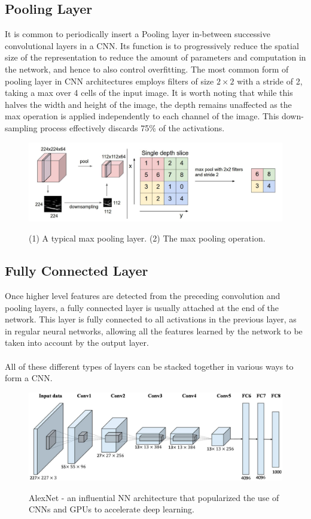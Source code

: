 \documentclass[12pt, a4paper]{report}
\begin{document}
\subsection{Pooling Layer}
It is common to periodically insert a Pooling layer in-between successive convolutional layers in a CNN. Its function is to progressively reduce the spatial size of the representation to reduce the amount of parameters and computation in the network, and hence to also control overfitting.\cite{cs231n} The most common form of pooling layer in CNN architectures employs filters of size $2 \times 2$ with a stride of 2, taking a max over 4 cells of the input image. It is worth noting that while this halves the width and height of the image, the depth remains unaffected as the max operation is applied independently to each channel of the image. This down-sampling process effectively discards 75\% of the activations.
\begin{figure}[h]
\centering
\includegraphics[width=\textwidth]{cnn2.jpg}
\caption{(1) A typical max pooling layer. (2) The max pooling operation.}\cite{cs231n}
\end{figure}
\subsection{Fully Connected Layer}
Once higher level features are detected from the preceding convolution and pooling layers, a fully connected layer is usually attached at the end of the network. This layer is fully connected to all activations in the previous layer, as in regular neural networks, allowing all the features learned by the network to be taken into account by the output layer.
\paragraph{}
All of these different types of layers can be stacked together in various ways to form a CNN.
\begin{figure}[h]
\centering
\includegraphics[width=\textwidth]{cnn3.jpg}
\caption{AlexNet - an influential NN architecture that popularized the use of CNNs and GPUs to accelerate deep learning.}\cite{alexnet, alexnetimg}
\end{figure}
\end{document}
